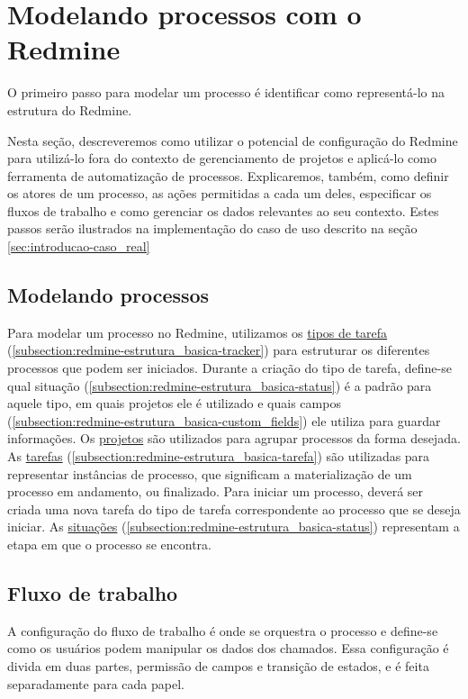 \section{Modelando processos com o Redmine}\label{sec:redmine-automatizar_processo}

O primeiro passo para modelar um processo é identificar como representá-lo na estrutura do Redmine.

Nesta seção, descreveremos como utilizar o potencial de configuração do Redmine para utilizá-lo fora do contexto de gerenciamento de projetos e aplicá-lo como ferramenta de automatização de processos. Explicaremos, também, como definir os atores de um processo, as ações permitidas a cada um deles, especificar os fluxos de trabalho e como gerenciar os dados relevantes ao seu contexto. Estes passos serão ilustrados na implementação do caso de uso descrito na seção \ref{sec:introducao-caso_real}

\subsection{Modelando processos}\label{subsection:redmine-automatizar_processo-criacao}

Para modelar um processo no Redmine, utilizamos os \underline{tipos de tarefa} (\ref{subsection:redmine-estrutura_basica-tracker}) para estruturar os diferentes processos que podem ser iniciados. Durante a criação do tipo de tarefa, define-se qual situação (\ref{subsection:redmine-estrutura_basica-status}) é a padrão para aquele tipo, em quais projetos ele é utilizado e quais campos (\ref{subsection:redmine-estrutura_basica-custom_fields}) ele utiliza para guardar informações. Os \underline{projetos} são utilizados para agrupar processos da forma desejada. As \underline{tarefas} (\ref{subsection:redmine-estrutura_basica-tarefa}) são utilizadas para representar instâncias de processo, que significam a materialização de um processo em andamento, ou finalizado. Para iniciar um processo, deverá ser criada uma nova tarefa do tipo de tarefa correspondente ao processo que se deseja iniciar. As \underline{situações} (\ref{subsection:redmine-estrutura_basica-status}) representam a etapa em que o processo se encontra. 

\subsection{Fluxo de trabalho}\label{subsection:redmine-fluxo_de_trabalho}

A configuração do fluxo de trabalho é onde se orquestra o processo e define-se como os usuários podem manipular os dados dos chamados. Essa configuração é divida em duas partes, permissão de campos e transição de estados, e é feita separadamente para cada papel.

